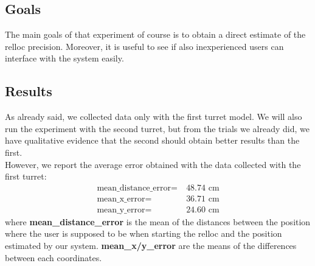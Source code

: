 \subsection{Goals}
The main goals of that experiment of course is to obtain a direct estimate of the relloc precision. Moreover, it is useful to see if also inexperienced users can interface with the system easily.

\subsection{Results}
As already said, we collected data only with the first turret model. We will also run the experiment with the second turret, but from the trials we already did, we have qualitative evidence that the second should obtain better results than the first. \\
However, we report the average error obtained with the data collected with the first turret:
\begin{align}
    \text{mean\_distance\_error} =&\ 48.74\text{ cm} \nonumber\\
    \text{mean\_x\_error} =&\ 36.71\text{ cm}\nonumber\\
    \text{mean\_y\_error} =&\ 24.60\text{ cm}\nonumber
\end{align}
where \textbf{mean\_distance\_error} is the mean of the distances between the position where the user is supposed to be when starting the relloc and the position estimated by our system. \textbf{mean\_x/y\_error} are the means of the differences between each coordinates.

